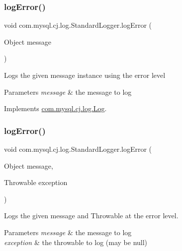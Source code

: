 \subsubsection{\texorpdfstring{log\+Error()}{logError()}\hspace{0.1cm}{\footnotesize\ttfamily [1/2]}}
{\footnotesize\ttfamily void com.\+mysql.\+cj.\+log.\+Standard\+Logger.\+log\+Error (\begin{DoxyParamCaption}\item[{Object}]{message }\end{DoxyParamCaption})}

Logs the given message instance using the \textquotesingle{}error\textquotesingle{} level


\begin{DoxyParams}{Parameters}
{\em message} & the message to log \\
\hline
\end{DoxyParams}


Implements \mbox{\hyperlink{interfacecom_1_1mysql_1_1cj_1_1log_1_1_log_ab6f35d1efab89f0c0316106fa4a15d2c}{com.\+mysql.\+cj.\+log.\+Log}}.

\mbox{\label{classcom_1_1mysql_1_1cj_1_1log_1_1_standard_logger_a536975e1d72a19baef92a859e27d2e7a}} 
\subsubsection{\texorpdfstring{log\+Error()}{logError()}\hspace{0.1cm}{\footnotesize\ttfamily [2/2]}}
{\footnotesize\ttfamily void com.\+mysql.\+cj.\+log.\+Standard\+Logger.\+log\+Error (\begin{DoxyParamCaption}\item[{Object}]{message,  }\item[{Throwable}]{exception }\end{DoxyParamCaption})}

Logs the given message and Throwable at the \textquotesingle{}error\textquotesingle{} level.


\begin{DoxyParams}{Parameters}
{\em message} & the message to log \\
\hline
{\em exception} & the throwable to log (may be null) \\
\hline
\end{DoxyParams}


